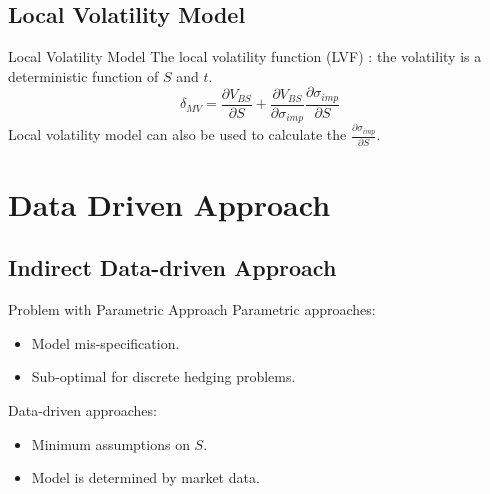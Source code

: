 \documentclass[10pt,table,mathserif]{beamer}
\begin{document}
\subsection{Local Volatility Model}
\begin{frame}{Local Volatility Model}
The local volatility function (LVF) \footnotemark : the volatility is a deterministic function of $S$ and $t$.
 \[
\delta_{MV}=\frac{\partial V_{BS}}{\partial S}+\frac{\partial V_{BS}}{\partial \sigma_{imp}}\frac{\partial \sigma_{imp}}{ \partial S}
\]
Local volatility model can also be used to calculate the $\frac{\partial \sigma_{imp}}{ \partial S}$.


\end{frame}
\section{Data Driven Approach}
\subsection{Indirect Data-driven Approach}
\begin{frame}{Problem with Parametric Approach}
Parametric approaches:
\begin{itemize}
  \item Model mis-specification.
  \item Sub-optimal for discrete hedging problems.
\end{itemize}

Data-driven approaches:
\begin{itemize}
  \item Minimum assumptions on $S$.
  \item Model is determined by market data.
\end{itemize}


\end{frame}
\end{document}
